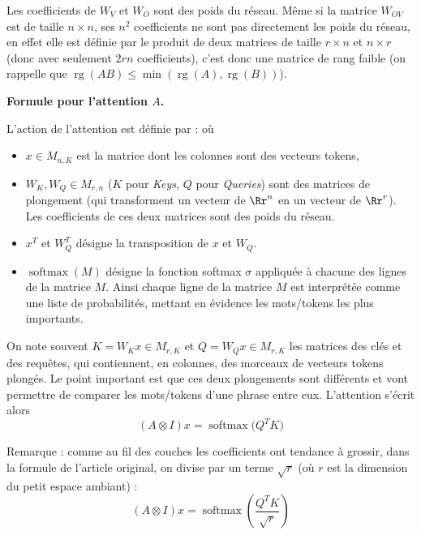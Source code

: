 \documentclass[11pt,class=report,crop=false]{standalone}
\begin{document}
Les coefficients de $W_V$ et $W_O$ sont des poids du réseau.
Même si la matrice $W_{OV}$ est de taille $n \times n$, ses $n^2$ coefficients ne sont pas directement les poids du réseau, en effet elle est définie par le produit de deux matrices de taille $r \times n$ et $n \times r$ (donc avec seulement $2rn$ coefficients), c'est donc une matrice de rang faible (on rappelle que $\operatorname{rg}(AB) \le \min( \operatorname{rg}(A) ,\operatorname{rg}(B) )$).


\bigskip

\textbf{Formule pour l'attention $A$.}

L'action de l'attention est définie par :
où 
\begin{itemize}
	\item $x \in M_{n,K}$ est la matrice dont les colonnes sont des vecteurs tokens,
	\item $W_K, W_Q \in M_{r,n}$ ($K$ pour \emph{Keys}, $Q$ pour \emph{Queries}) sont des matrices de plongement (qui transforment un vecteur de $\Rr^n$ en un vecteur de $\Rr^r$). Les coefficients de ces deux matrices sont des poids du réseau.
	\item $x^T$ et $W_Q^T$ désigne la transposition de $x$ et $W_Q$.
	\item $\operatorname{softmax}(M)$ désigne la fonction softmax $\sigma$ appliquée à chacune des lignes de la matrice $M$. Ainsi chaque ligne de la matrice $M$ est interprétée comme une liste de probabilités, mettant en évidence les mots/tokens les plus importants.
	
\end{itemize}


On note souvent $K = W_K x \in M_{r,K}$ et $Q = W_Q x \in M_{r,K}$ les matrices des clés et des requêtes, qui contiennent, en colonnes, des morceaux de vecteurs tokens plongés.
Le point important est que ces deux plongements sont différents et vont permettre de comparer les mots/tokens d'une phrase entre eux.
L'attention s'écrit alors
$$(A \otimes I) x = \operatorname{softmax} \big( Q^T K \big)$$

Remarque : comme au fil des couches les coefficients ont tendance à grossir, dans la formule de l'article original, on divise par un terme $\sqrt{r}$ (où $r$ est la dimension du petit espace ambiant) : 
$$(A \otimes I) x = \operatorname{softmax} \left( \frac{Q^T K}{\sqrt r} \right)$$


\end{document}

